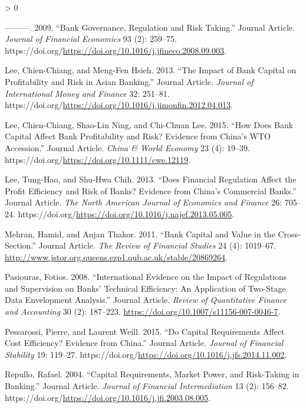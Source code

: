 \documentclass{article}
\newlength{\cslhangindent}
\newenvironment{CSLReferences}[2] %
 {%
  \setlength{\parindent}{0pt}
  \ifodd #1 \everypar{\setlength{\hangindent}{\cslhangindent}}\ignorespaces\fi
  \ifnum #2 > 0
  \setlength{\parskip}{#2\baselineskip}
  \fi
 }%
 {}
\begin{document}
\begin{CSLReferences}{1}{0}
\leavevmode\hypertarget{ref-RN1}{}%
---------. 2009. {``Bank Governance, Regulation and Risk Taking.''}
Journal Article. \emph{Journal of Financial Economics} 93 (2): 259--75.
https://doi.org/\url{https://doi.org/10.1016/j.jfineco.2008.09.003}.

\leavevmode\hypertarget{ref-RN61}{}%
Lee, Chien-Chiang, and Meng-Fen Hsieh. 2013. {``The Impact of Bank
Capital on Profitability and Risk in Asian Banking.''} Journal Article.
\emph{Journal of International Money and Finance} 32: 251--81.
https://doi.org/\url{https://doi.org/10.1016/j.jimonfin.2012.04.013}.

\leavevmode\hypertarget{ref-RN62}{}%
Lee, Chien-Chiang, Shao-Lin Ning, and Chi-Chuan Lee. 2015. {``How Does
Bank Capital Affect Bank Profitability and Risk? Evidence from China's
WTO Accession.''} Journal Article. \emph{China \& World Economy} 23 (4):
19--39. https://doi.org/\url{https://doi.org/10.1111/cwe.12119}.

\leavevmode\hypertarget{ref-RN63}{}%
Lee, Tung-Hao, and Shu-Hwa Chih. 2013. {``Does Financial Regulation
Affect the Profit Efficiency and Risk of Banks? Evidence from China's
Commercial Banks.''} Journal Article. \emph{The North American Journal
of Economics and Finance} 26: 705--24.
https://doi.org/\url{https://doi.org/10.1016/j.najef.2013.05.005}.

\leavevmode\hypertarget{ref-RN64}{}%
Mehran, Hamid, and Anjan Thakor. 2011. {``Bank Capital and Value in the
Cross-Section.''} Journal Article. \emph{The Review of Financial
Studies} 24 (4): 1019--67.
\url{http://www.jstor.org.queens.ezp1.qub.ac.uk/stable/20869264}.

\leavevmode\hypertarget{ref-RN65}{}%
Pasiouras, Fotios. 2008. {``International Evidence on the Impact of
Regulations and Supervision on Banks' Technical Efficiency: An
Application of Two-Stage Data Envelopment Analysis.''} Journal Article.
\emph{Review of Quantitative Finance and Accounting} 30 (2): 187--223.
\url{https://doi.org/10.1007/s11156-007-0046-7}.

\leavevmode\hypertarget{ref-RN66}{}%
Pessarossi, Pierre, and Laurent Weill. 2015. {``Do Capital Requirements
Affect Cost Efficiency? Evidence from China.''} Journal Article.
\emph{Journal of Financial Stability} 19: 119--27.
https://doi.org/\url{https://doi.org/10.1016/j.jfs.2014.11.002}.

\leavevmode\hypertarget{ref-RN67}{}%
Repullo, Rafael. 2004. {``Capital Requirements, Market Power, and
Risk-Taking in Banking.''} Journal Article. \emph{Journal of Financial
Intermediation} 13 (2): 156--82.
https://doi.org/\url{https://doi.org/10.1016/j.jfi.2003.08.005}.


\end{CSLReferences}
\end{document}
